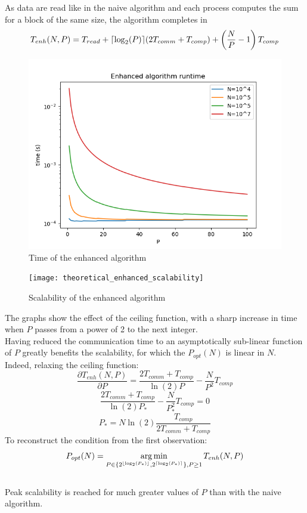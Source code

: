 \documentclass[a4paper, 11pt, twoside, openright]{article}
\DeclareMathOperator*{\argmin}{arg\,min}
\DeclarePairedDelimiter{\ceil}{\lceil}{\rceil}
\DeclarePairedDelimiter{\floor}{\lfloor}{\rfloor}
\begin{document}
As data are read like in the naive algorithm and each process computes the sum for a block of the same size, the algorithm completes in
$$T_{enh}(N, P) = T_{read} + \ceil*{\log_{2}(P)} (2T_{comm} + T_{comp}) + \left(\frac{N}{P}-1\right)T_{comp}$$
\begin{figure}[h]
    \includegraphics[width=12cm]{theoretical_enhanced_time}
    \caption{Time of the enhanced algorithm}
\end{figure}
\begin{figure}[h]
    \texttt{[image: theoretical\_enhanced\_scalability]}
    \caption{Scalability of the enhanced algorithm}
\end{figure}
\FloatBarrier
The graphs show the effect of the ceiling function, with a sharp increase in time when $P$ passes from a power of 2 to the next integer.\\
Having reduced the communication time to an asymptotically sub-linear function of $P$ greatly benefits the scalability, for which the $P_{opt}(N)$ is linear in $N$.\\
Indeed, relaxing the ceiling function:
$$\frac{\partial T_{enh}(N, P)}{\partial P} = \frac{2T_{comm} + T_{comp}}{\ln(2)P} -\frac{N}{P^{2}} T_{comp}$$
$$\frac{2T_{comm} + T_{comp}}{\ln(2)P_{*}} - \frac{N}{P_{*}^{2}} T_{comp} = 0$$
$$P_{*} = N\ln(2)\frac{T_{comp}}{2T_{comm} + T_{comp}}$$
To reconstruct the condition from the first observation:
$$P_{opt}(N) = \argmin_{P \in \{ 2^{\floor{\log_2(P_{*})}}, 2^{\ceil{\log_2(P_{*})}} \}, P \geq 1}{T_{enh}(N, P)} $$\\
Peak scalability is reached for much greater values of $P$ than with the naive algorithm.\\
\end{document}
